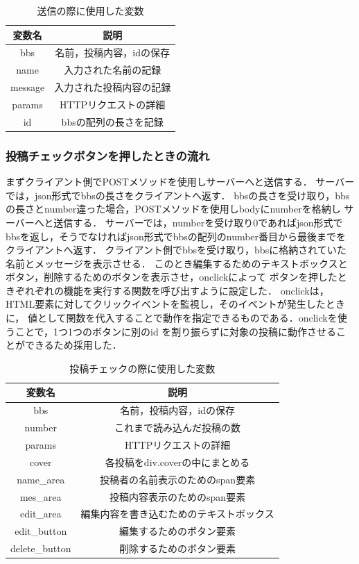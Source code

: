 \documentclass{jsarticle}
\begin{document}
\begin{table}[ht]\caption{送信の際に使用した変数}
    \centering
    \begin{tabular}{|c|c|}
       \hline
       変数名 &  説明  \\ 
        \hline
        bbs  &  名前，投稿内容，idの保存\\ \hline
        name &  入力された名前の記録  \\ \hline
        message  & 入力された投稿内容の記録  \\ \hline
        params& HTTPリクエストの詳細 \\ \hline
        id &  bbsの配列の長さを記録 \\ \hline
    \end{tabular}
    \label{post}
\end{table}


\subsubsection*{投稿チェックボタンを押したときの流れ}
まずクライアント側でPOSTメソッドを使用しサーバーへと送信する．
サーバーでは，json形式でbbsの長さをクライアントへ返す．
bbsの長さを受け取り，bbsの長さとnumber違った場合，POSTメソッドを使用しbodyにnumberを格納し
サーバーへと送信する．
サーバーでは，numberを受け取り0であればjson形式でbbsを返し，そうでなければjson形式でbbsの配列のnumber番目から最後までを
クライアントへ返す．
クライアント側でbbsを受け取り，bbsに格納されていた名前とメッセージを表示させる．
このとき編集するためのテキストボックスとボタン，削除するためのボタンを表示させ，onclickによって
ボタンを押したときぞれぞれの機能を実行する関数を呼び出すように設定した．
onclickは，HTML要素に対してクリックイベントを監視し，そのイベントが発生したときに，
値として関数を代入することで動作を指定できるものである．onclickを使うことで，1つ1つのボタンに別のid
を割り振らずに対象の投稿に動作させることができるため採用した．

\begin{table}[ht]\caption{投稿チェックの際に使用した変数}
    \centering
    \begin{tabular}{|c|c|}
       \hline
       変数名 &  説明  \\ 
        \hline
        bbs  &  名前，投稿内容，idの保存\\ \hline
        number   & これまで読み込んだ投稿の数  \\ \hline
        params& HTTPリクエストの詳細 \\ \hline
        cover &  各投稿をdiv.coverの中にまとめる \\ \hline
        name\_area& 投稿者の名前表示のためのspan要素 \\ \hline
        mes\_area& 投稿内容表示のためのspan要素\\ \hline
        edit\_area& 編集内容を書き込むためのテキストボックス\\ \hline
        edit\_button& 編集するためのボタン要素\\ \hline
        delete\_button& 削除するためのボタン要素\\ \hline
    \end{tabular}
    \label{check}
\end{table}
\end{document}
